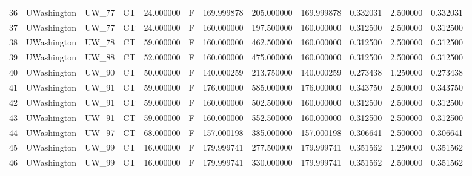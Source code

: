\begin{tabular}{llllrlrrrrrr}
36     &     UWashington &        UW\_77 &                 CT &  24.000000 &        F &       169.999878 &    205.000000 &  169.999878 &               0.332031 &            2.500000 &          0.332031 \\
37     &     UWashington &        UW\_77 &                 CT &  24.000000 &        F &       160.000000 &    197.500000 &  160.000000 &               0.312500 &            2.500000 &          0.312500 \\
38     &     UWashington &        UW\_78 &                 CT &  59.000000 &        F &       160.000000 &    462.500000 &  160.000000 &               0.312500 &            2.500000 &          0.312500 \\
39     &     UWashington &        UW\_88 &                 CT &  52.000000 &        F &       160.000000 &    475.000000 &  160.000000 &               0.312500 &            2.500000 &          0.312500 \\
40     &     UWashington &        UW\_90 &                 CT &  50.000000 &        F &       140.000259 &    213.750000 &  140.000259 &               0.273438 &            1.250000 &          0.273438 \\
41     &     UWashington &        UW\_91 &                 CT &  59.000000 &        F &       176.000000 &    585.000000 &  176.000000 &               0.343750 &            2.500000 &          0.343750 \\
42     &     UWashington &        UW\_91 &                 CT &  59.000000 &        F &       160.000000 &    502.500000 &  160.000000 &               0.312500 &            2.500000 &          0.312500 \\
43     &     UWashington &        UW\_91 &                 CT &  59.000000 &        F &       160.000000 &    552.500000 &  160.000000 &               0.312500 &            2.500000 &          0.312500 \\
44     &     UWashington &        UW\_97 &                 CT &  68.000000 &        F &       157.000198 &    385.000000 &  157.000198 &               0.306641 &            2.500000 &          0.306641 \\
45     &     UWashington &        UW\_99 &                 CT &  16.000000 &        F &       179.999741 &    277.500000 &  179.999741 &               0.351562 &            1.250000 &          0.351562 \\
46     &     UWashington &        UW\_99 &                 CT &  16.000000 &        F &       179.999741 &    330.000000 &  179.999741 &               0.351562 &            2.500000 &          0.351562 \\

\end{tabular}
